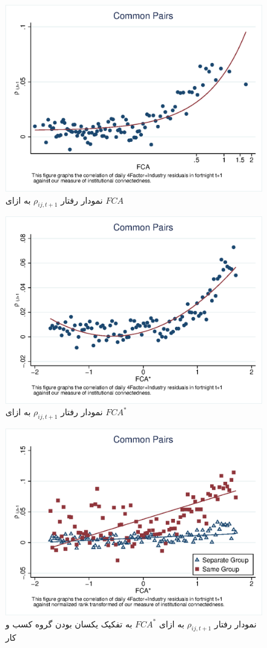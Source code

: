 \documentclass[12pt]{article}
\begin{document}
    
    
        \begin{figure}[htbp]
        \centering
        \includegraphics[width=.7\linewidth]{wcorr50.eps}
          \caption{نمودار رفتار  
              $ \rho_{ij,{t+1}} $
              به ازای 
          $ FCA $ 
          }
          \label{f8}
        \end{figure} 
    
    
    \begin{figure}[htbp]
    \centering
    \includegraphics[width=.7\linewidth]{wcorr5.eps}
      \caption{نمودار رفتار  
          $ \rho_{ij,{t+1}} $
         به ازای 
      $ FCA^* $ 
      }
      \label{f7}
    \end{figure}  

    
    \begin{figure}[htbp]
    \centering
    \includegraphics[width=.7\linewidth]{wcorr5g.eps}
      \caption{نمودار رفتار  
          $ \rho_{ij,{t+1}} $
         به ازای 
      $ FCA^* $ 
      به تفکیک یکسان بودن گروه کسب و کار}
      \label{f4}
    \end{figure}
  
\end{document}

